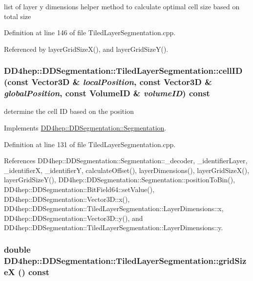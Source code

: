 list of layer y dimensions helper method to calculate optimal cell size based on total size 

Definition at line 146 of file TiledLayerSegmentation.cpp.

Referenced by layerGridSizeX(), and layerGridSizeY().\hypertarget{class_d_d4hep_1_1_d_d_segmentation_1_1_tiled_layer_segmentation_a481dd2415b1b931234efbca27617f1dd}{
\subsubsection[{cellID}]{ DD4hep::DDSegmentation::TiledLayerSegmentation::cellID (const {\bf Vector3D} \& {\em localPosition}, \/  const {\bf Vector3D} \& {\em globalPosition}, \/  const {\bf VolumeID} \& {\em volumeID}) const}}
\label{class_d_d4hep_1_1_d_d_segmentation_1_1_tiled_layer_segmentation_a481dd2415b1b931234efbca27617f1dd}


determine the cell ID based on the position 

Implements \hyperlink{class_d_d4hep_1_1_d_d_segmentation_1_1_segmentation_ad5a60953d96d409850d8192f64f8ce3c}{DD4hep::DDSegmentation::Segmentation}.

Definition at line 131 of file TiledLayerSegmentation.cpp.

References DD4hep::DDSegmentation::Segmentation::\_\-decoder, \_\-identifierLayer, \_\-identifierX, \_\-identifierY, calculateOffset(), layerDimensions(), layerGridSizeX(), layerGridSizeY(), DD4hep::DDSegmentation::Segmentation::positionToBin(), DD4hep::DDSegmentation::BitField64::setValue(), DD4hep::DDSegmentation::Vector3D::x(), DD4hep::DDSegmentation::TiledLayerSegmentation::LayerDimensions::x, DD4hep::DDSegmentation::Vector3D::y(), and DD4hep::DDSegmentation::TiledLayerSegmentation::LayerDimensions::y.\hypertarget{class_d_d4hep_1_1_d_d_segmentation_1_1_tiled_layer_segmentation_a259da236fc6000191d8501aeeb2fa0de}{
\subsubsection[{gridSizeX}]{\setlength{\rightskip}{0pt plus 5cm}double DD4hep::DDSegmentation::TiledLayerSegmentation::gridSizeX () const}}
\label{class_d_d4hep_1_1_d_d_segmentation_1_1_tiled_layer_segmentation_a259da236fc6000191d8501aeeb2fa0de}



